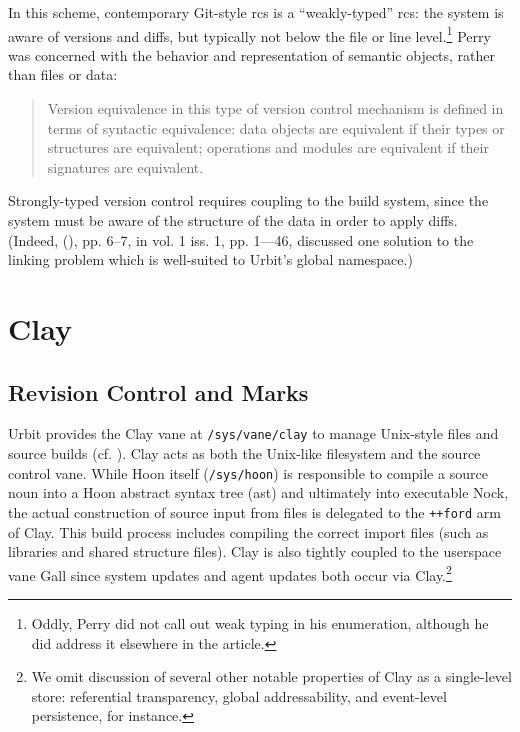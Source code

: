 \documentclass[twoside]{article}
\begin{document}
\noindent
In this scheme, contemporary Git-style {\sc rcs} is a ``weakly-typed'' {\sc rcs}:  the system is aware of versions and diffs, but typically not below the file or line level.\footnote{Oddly, Perry did not call out weak typing in his enumeration, although he did address it elsewhere in the article.}  Perry was concerned with the behavior and representation of semantic objects, rather than files or data:

\begin{quote}
  Version equivalence in this type of version control mechanism is defined in terms of syntactic equivalence:  data objects are equivalent if their types or structures are equivalent; operations and modules are equivalent if their signatures are equivalent.  \citep{Perry1987}
\end{quote}

\noindent
Strongly-typed version control requires coupling to the build system, since the system must be aware of the structure of the data in order to apply diffs.  (Indeed, \citeauthor{Blackman2024} (\citeyear{Blackman2024}), pp. 6–7, in  vol. 1 iss. 1, pp. 1—46, discussed one solution to the linking problem which is well-suited to Urbit's global namespace.)


\section{Clay}

\subsection{Revision Control and Marks}

Urbit provides the Clay vane at \lstinline[style=inlinecode]{/sys/vane/clay} to manage Unix-style files and source builds (cf. \citet{Yarvin2016}).  Clay acts as both the Unix-like filesystem and the source control vane.  While Hoon itself (\lstinline[style=inlinecode]{/sys/hoon}) is responsible to compile a source noun into a Hoon abstract syntax tree ({\sc ast}) and ultimately into executable Nock, the actual construction of source input from files is delegated to the \lstinline[style=inlinecode]{++ford} arm of Clay.  This build process includes compiling the correct import files (such as libraries and shared structure files).  Clay is also tightly coupled to the userspace vane Gall since system updates and agent updates both occur via Clay.\footnote{We omit discussion of several other notable properties of Clay as a single-level store:  referential transparency, global addressability, and event-level persistence, for instance.}
\end{document}
